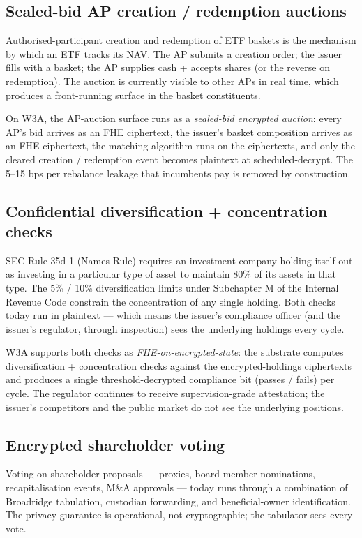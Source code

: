 \subsection{Sealed-bid AP creation / redemption auctions}

Authorised-participant creation and redemption of ETF baskets is the
mechanism by which an ETF tracks its NAV. The AP submits a creation
order; the issuer fills with a basket; the AP supplies cash + accepts
shares (or the reverse on redemption). The auction is currently visible
to other APs in real time, which produces a front-running surface in
the basket constituents.

On W3A, the AP-auction surface runs as a \emph{sealed-bid encrypted
auction}: every AP's bid arrives as an FHE ciphertext, the issuer's
basket composition arrives as an FHE ciphertext, the matching algorithm
runs on the ciphertexts, and only the cleared creation / redemption
event becomes plaintext at scheduled-decrypt. The 5--15 bps per
rebalance leakage that incumbents pay is removed by construction.

\subsection{Confidential diversification + concentration checks}

SEC Rule 35d-1 (Names Rule) requires an investment company holding
itself out as investing in a particular type of asset to maintain 80\%
of its assets in that type. The 5\% / 10\% diversification limits under
Subchapter M of the Internal Revenue Code constrain the concentration
of any single holding. Both checks today run in plaintext --- which
means the issuer's compliance officer (and the issuer's regulator,
through inspection) sees the underlying holdings every cycle.

W3A supports both checks as \emph{FHE-on-encrypted-state}: the
substrate computes diversification + concentration checks against the
encrypted-holdings ciphertexts and produces a single
threshold-decrypted compliance bit (passes / fails) per cycle. The
regulator continues to receive supervision-grade attestation; the
issuer's competitors and the public market do not see the underlying
positions.

\subsection{Encrypted shareholder voting}

Voting on shareholder proposals --- proxies, board-member nominations,
recapitalisation events, M\&A approvals --- today runs through a
combination of Broadridge tabulation, custodian forwarding, and
beneficial-owner identification. The privacy guarantee is operational,
not cryptographic; the tabulator sees every vote.


